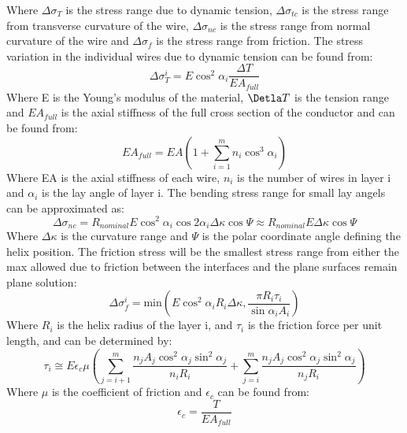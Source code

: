 \noindent Where $\Delta \sigma_T$ is the stress range due to dynamic tension, $\Delta \sigma_{tc}$ is the stress range from transverse curvature of the wire, $\Delta \sigma_{nc}$ is the stress range from normal curvature of the wire and $\Delta \sigma_{f}$ is the stress range from friction. The stress variation in the individual wires due to dynamic tension can be found from:
\begin{equation}
    \Delta \sigma_T^i = E \cos^2 \alpha_i \frac{\Delta T}{E A_{full}} 
\end{equation}
\noindent Where E is the Young's modulus of the material, $\Detla T$ is the tension range and $EA_{full}$  is the axial stiffness of the full cross section of the conductor and can be found from:
\begin{equation}
    EA_{full}=EA \left( 1+\sum_{i=1}^m n_i \cos^3\alpha_i \right)
\end{equation}
\noindent Where EA is the axial stiffness of each wire, $n_i$ is the number of wires in layer i and $\alpha_i$ is the lay angle of layer i. \newline
\newline
The bending stress range for small lay angels can be approximated as:
\begin{equation}
    \Delta \sigma_{nc} = R_{nominal} E \cos^2 \alpha_i \cos2 \alpha_i \Delta \kappa \cos \Psi \approx R_{nominal}E \Delta \kappa \cos \Psi
\end{equation}
Where $\Delta \kappa$ is the curvature range and $\Psi$ is the polar coordinate angle defining the helix position. \newline
\newline
The friction stress will be the smallest stress range from either the max allowed due to friction between the interfaces and the plane surfaces remain plane solution:
\begin{equation}
    \Delta \sigma_f^i =\text{min}\left(E \cos^2 \alpha_i R_i \Delta \kappa , \frac{\pi R_i \tau_i}{\sin \alpha_i A_i}\right)
\end{equation}
Where $R_i$ is the helix radius of the layer i, and $\tau_i$ is the friction force per unit length, and can be determined by:
\begin{equation}
    \tau_i \cong E \epsilon_c \mu \left( \sum_{j=i+1}^m \frac{n_j A_j \cos^2 \alpha_j \sin^2 \alpha_j }{n_i R_i} + \sum_{j=i}^m \frac{n_j A_j \cos^2 \alpha_j  \sin^2 \alpha_j}{n_j R_i}\right)
\end{equation}
Where $\mu$ is the coefficient of friction and $\epsilon_c$ can be found from:
\begin{equation}
    \epsilon_c =\frac{T}{EA_{full}}
    \label{eq:stressvariation2}
\end{equation}